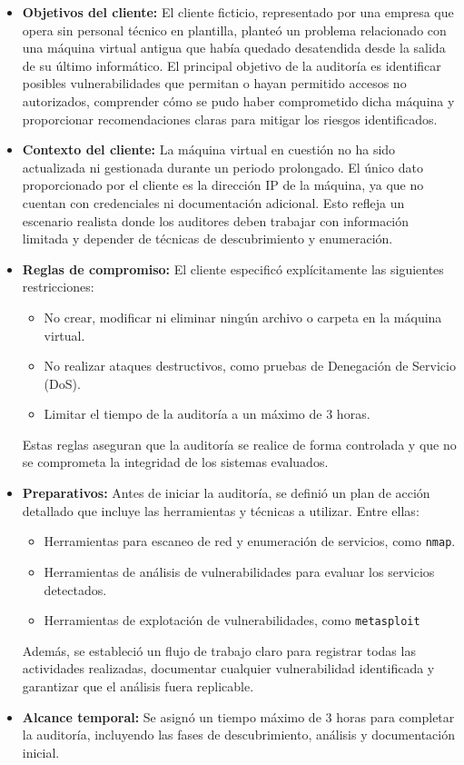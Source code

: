 \documentclass[11pt,oneside,a4paper]{book}
\begin{document}
\begin{itemize}
    \item \textbf{Objetivos del cliente:}  
    El cliente ficticio, representado por una empresa que opera sin personal técnico en plantilla, planteó un problema relacionado con una máquina virtual antigua que había quedado desatendida desde la salida de su último informático. El principal objetivo de la auditoría es identificar posibles vulnerabilidades que permitan o hayan permitido accesos no autorizados, comprender cómo se pudo haber comprometido dicha máquina y proporcionar recomendaciones claras para mitigar los riesgos identificados. 

    \item \textbf{Contexto del cliente:}  
    La máquina virtual en cuestión no ha sido actualizada ni gestionada durante un periodo prolongado. El único dato proporcionado por el cliente es la dirección IP de la máquina, ya que no cuentan con credenciales ni documentación adicional. Esto refleja un escenario realista donde los auditores deben trabajar con información limitada y depender de técnicas de descubrimiento y enumeración.

    \item \textbf{Reglas de compromiso:}  
    El cliente especificó explícitamente las siguientes restricciones:
    \begin{itemize}
        \item No crear, modificar ni eliminar ningún archivo o carpeta en la máquina virtual.
        \item No realizar ataques destructivos, como pruebas de Denegación de Servicio (DoS).
        \item Limitar el tiempo de la auditoría a un máximo de 3 horas.
    \end{itemize}
    Estas reglas aseguran que la auditoría se realice de forma controlada y que no se comprometa la integridad de los sistemas evaluados.

    \item \textbf{Preparativos:}  
    Antes de iniciar la auditoría, se definió un plan de acción detallado que incluye las herramientas y técnicas a utilizar. Entre ellas:
    \begin{itemize}
        \item Herramientas para escaneo de red y enumeración de servicios, como \texttt{nmap}.
        \item Herramientas de análisis de vulnerabilidades para evaluar los servicios detectados.
        \item Herramientas de explotación de vulnerabilidades, como \texttt{metasploit}
    \end{itemize}
    Además, se estableció un flujo de trabajo claro para registrar todas las actividades realizadas, documentar cualquier vulnerabilidad identificada y garantizar que el análisis fuera replicable.

    \item \textbf{Alcance temporal:}  
    Se asignó un tiempo máximo de 3 horas para completar la auditoría, incluyendo las fases de descubrimiento, análisis y documentación inicial.
\end{itemize}
\end{document}

